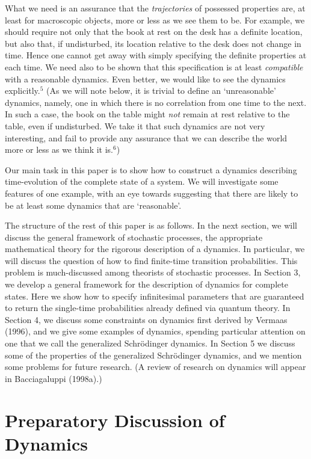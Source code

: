 \documentclass[12pt]{article}
\begin{document}
What we need is an assurance that the {\it trajectories} of possessed 
properties are, at least for macroscopic objects, more or less as we 
see them to be.  For example, we should require not only that the book 
at rest on the desk has a definite location, but also that, if 
undisturbed, its location relative to the desk does not change in 
time.  Hence one cannot get away with simply specifying the definite 
properties at each time.  We need also to be shown that this 
specification is at least {\it compatible} with a reasonable dynamics.  
Even better, we would like to see the dynamics explicitly.$^5$ (As we 
will note below, it is trivial to define an `unreasonable' dynamics, 
namely, one in which there is no correlation from one time to the 
next.  In such a case, the book on the table might {\it not} remain at 
rest relative to the table, even if undisturbed.  We take it that such 
dynamics are not very interesting, and fail to provide any assurance 
that we can describe the world more or less as we think it is.$^6$)

Our main task in this paper is to show how to construct a dynamics 
describing time-evolution of the complete state of a system.  We will 
investigate some features of one example, with an eye towards 
suggesting that there are likely to be at least some dynamics that are 
`reasonable'.

The structure of the rest of this paper is as follows.  In the next 
section, we will discuss the general framework of stochastic 
processes, the appropriate mathematical theory for the rigorous 
description of a dynamics.  In particular, we will discuss the 
question of how to find finite-time transition probabilities.  This 
problem is much-discussed among theorists of stochastic processes.  In 
Section 3, we develop a general framework for the description of 
dynamics for complete states.  Here we show how to specify 
infinitesimal parameters that are guaranteed to return the single-time 
probabilities already defined via quantum theory.  In Section 4, we 
discuss some constraints on dynamics first derived by Vermaas (1996), 
and we give some examples of dynamics, spending particular attention 
on one that we call the generalized Schr\"odinger dynamics.  In 
Section 5 we discuss some of the properties of the generalized 
Schr\"odinger dynamics, and we mention some problems for future 
research.  (A review of research on dynamics will appear in 
Bacciagaluppi (1998a).)


\section{Preparatory Discussion of Dynamics}
\end{document}
